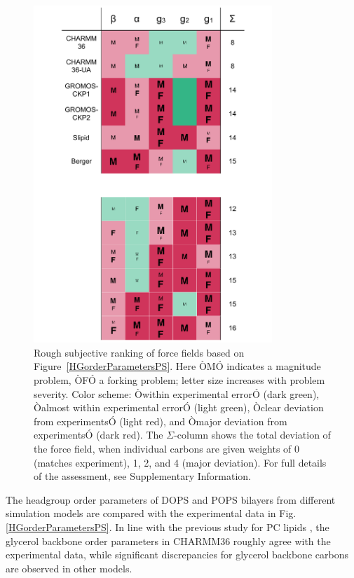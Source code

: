 \documentclass[aps,prl,superscriptaddress,twocolumn]{revtex4}
\begin{document}
\begin{figure}[]
  \centering
  \includegraphics[width=9.0cm]{../Figs/comparisonTablePS.pdf}
  \caption{\label{comparisonTablePS}
  Rough subjective ranking of force fields based on Figure~\ref{HGorderParametersPS}. Here ÒMÓ indicates a magnitude problem, ÒFÓ a forking problem; letter size increases with problem severity. Color scheme: Òwithin experimental errorÓ (dark green), Òalmost within experimental errorÓ (light green), Òclear deviation from experimentsÓ (light red), and Òmajor deviation from experimentsÓ (dark red). The $\Sigma$-column shows the total deviation of the force field, when individual carbons are given weights of 0 (matches experiment), 1, 2, and 4 (major deviation). For full details of the assessment, see Supplementary Information.
  }
\end{figure}

The headgroup order parameters of DOPS and POPS bilayers 
from different simulation models are compared with the experimental
data in Fig. \ref{HGorderParametersPS}. In line with the previous
study for PC lipids \cite{botan15}, the glycerol backbone order 
parameters in CHARMM36 roughly agree with the experimental data,
while significant discrepancies for glycerol backbone carbons
are observed in other models.
\end{document}

